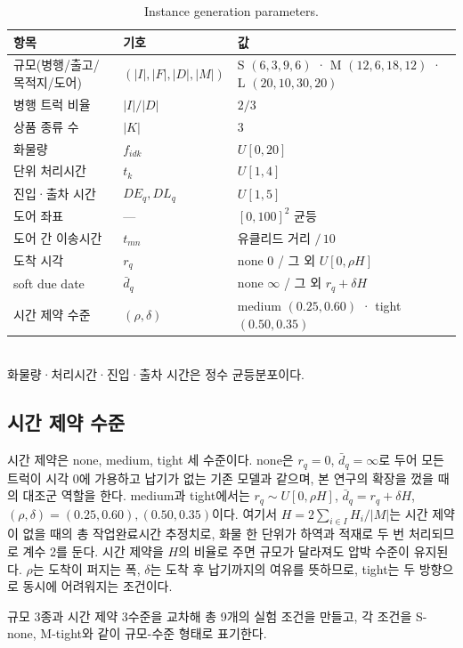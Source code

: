 \documentclass[10pt,a4paper]{article}
\begin{document}
\begin{table}[H]\centering
\caption{Instance generation parameters.}
\label{tab:param}\small
\begin{tabular}{@{}llp{}@{}}
\toprule
항목 & 기호 & 값 \\
\midrule
규모(병행/출고/목적지/도어) & $(|I|,|F|,|D|,|M|)$ & S $(6,3,9,6)$ · M $(12,6,18,12)$ · L $(20,10,30,20)$ \\
병행 트럭 비율 & $|I|/|D|$ & $2/3$ \\
상품 종류 수 & $|K|$ & 3 \\
화물량 & $f_{idk}$ & $U[0,20]$ \\
단위 처리시간 & $t_k$ & $U[1,4]$ \\
진입·출차 시간 & $DE_q,DL_q$ & $U[1,5]$ \\
도어 좌표 & --- & $[0,100]^2$ 균등 \\
도어 간 이송시간 & $t_{mn}$ & 유클리드 거리 $/\,10$ \\
도착 시각 & $r_q$ & none $0$ / 그 외 $U[0,\rho H]$ \\
soft due date & $\bar d_q$ & none $\infty$ / 그 외 $r_q+\delta H$ \\
시간 제약 수준 & $(\rho,\delta)$ & medium $(0.25,0.60)$ · tight $(0.50,0.35)$ \\
\bottomrule
\end{tabular}\\[2pt]
{\footnotesize 화물량·처리시간·진입·출차 시간은 정수 균등분포이다.}
\end{table}

\subsection{시간 제약 수준}
시간 제약은 none, medium, tight 세 수준이다. none은 $r_q=0$, $\bar d_q=\infty$로 두어
모든 트럭이 시각 0에 가용하고 납기가 없는 기존 모델과 같으며, 본 연구의 확장을 껐을 때의
대조군 역할을 한다. medium과 tight에서는 $r_q\sim U[0,\rho H]$, $\bar d_q=r_q+\delta H$,
$(\rho,\delta)=(0.25,0.60),(0.50,0.35)$이다. 여기서 $H=2\sum_{i\in I}H_i/|M|$는 시간
제약이 없을 때의 총 작업완료시간 추정치로, 화물 한 단위가 하역과 적재로 두 번 처리되므로
계수 2를 둔다. 시간 제약을 $H$의 비율로 주면 규모가 달라져도 압박 수준이 유지된다.
$\rho$는 도착이 퍼지는 폭, $\delta$는 도착 후 납기까지의 여유를 뜻하므로, tight는 두
방향으로 동시에 어려워지는 조건이다.

규모 3종과 시간 제약 3수준을 교차해 총 9개의 실험 조건을 만들고, 각 조건을 S-none,
M-tight와 같이 규모-수준 형태로 표기한다.
\end{document}

